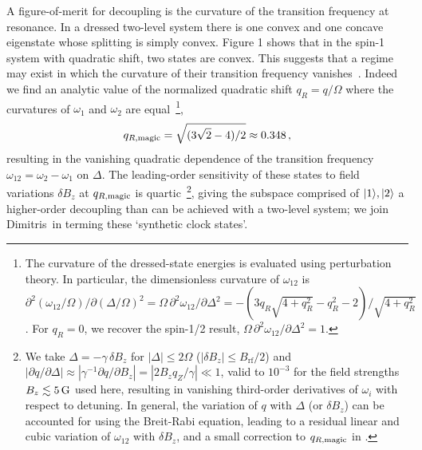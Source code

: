 \documentclass[aps,prl,reprint,superscriptaddress,floatfix]{revtex4-1}
\begin{document}
A figure-of-merit for decoupling is the curvature of the transition frequency at resonance.
In a dressed two-level system there is one convex and one concave eigenstate whose splitting is simply convex.
Figure 1 shows that in the spin-1 system with quadratic shift, two states are convex.
This suggests that a regime may exist in which the curvature of their transition frequency vanishes~\cite{rabl_strong_2009,*xu_coherence-protected_2012}.
Indeed we find an analytic value of the normalized quadratic shift $q_R=q/\Omega$ where the curvatures of $\omega_1$ and $\omega_2$ are equal~\footnote{
  The curvature of the dressed-state energies is evaluated using perturbation theory. In particular, the dimensionless curvature of $\omega_{12}$ is $\partial^2(\omega_{12}/\Omega)/\partial(\Delta/\Omega)^2 = \Omega \, \partial^2\omega_{12}/\partial \Delta^2 = -(3 q_R \sqrt{4 + q_R^2} - q_R^2 - 2)/\sqrt{4 + q_R^2}$. For $q_R = 0$, we recover the spin-1/2 result, $\Omega\, \partial^2\omega_{12}/\partial \Delta^2 = 1$.},
\begin{align}
\label{eq:qRmagic}
    q_{R,\text{magic}} = \sqrt{(3\sqrt{2} - 4)/2} \approx 0.348 \, ,
\end{align}
resulting in the vanishing quadratic dependence of the transition frequency $\omega_{12}=\omega_2 - \omega_1$ on $\Delta$.
The leading-order sensitivity of these states to field variations $\delta B_z$ at $q_{R,\text{magic}}$ is quartic~\footnote{
    We take $\Delta = -\gamma \, \delta B_z$ for $|\Delta | \leq 2\Omega$ ($| \delta B_z | \leq B_{\text{rf}}/2$) and $| \partial q / \partial \Delta | \approx | \gamma^{-1} \partial q / \partial B_z | = |2 B_z q_Z / \gamma| \ll 1$, valid to $10^{-3}$ for the field strengths $B_z \lesssim \unit[5]{G}$ used here, resulting in vanishing third-order derivatives of $\omega_i$ with respect to detuning. 
    In general, the variation of $q$ with $\Delta$ (or $\delta B_z$) can be accounted for using the Breit-Rabi equation, leading to a residual linear and cubic variation of $\omega_{12}$ with $\delta B_z$, and a small correction to $q_{R,\text{magic}}$ in .},
giving the subspace comprised of ${\vert 1 \rangle ,\vert 2 \rangle }$ a higher-order decoupling than can be achieved with a two-level system; we join Dimitris~\etal in terming these `synthetic clock states'.
\end{document}

